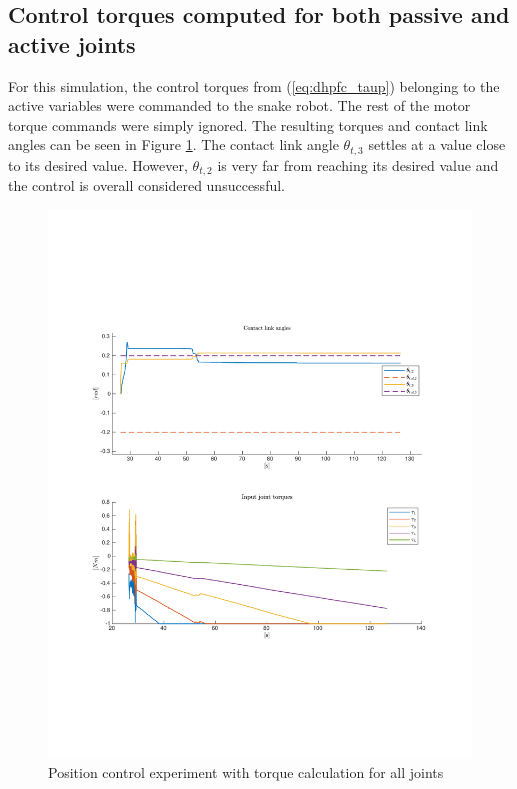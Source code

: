 \subsection{Control torques computed for both passive and active joints}

For this simulation, the control torques from (\ref{eq:dhpfc_taup}) belonging to the active variables were commanded to the snake robot. The rest of the motor torque commands were simply ignored. The resulting torques and contact link angles can be seen in Figure \ref{fig:2xp-1}. The contact link angle $\theta_{t,3}$ settles at a value close to its desired value. However, $\theta_{t,2}$ is very far from reaching its desired value and the control is overall considered unsuccessful.

\begin{figure}[H]
    \centering
    \includegraphics[trim=2.1cm 6cm 2.1cm 5cm, clip=true, width=\textwidth]{figures/experiments/2xpos/2xpos-2plot-fail.pdf}
    \caption{Position control experiment with torque calculation for all joints}
    \label{fig:2xp-1}
\end{figure}

